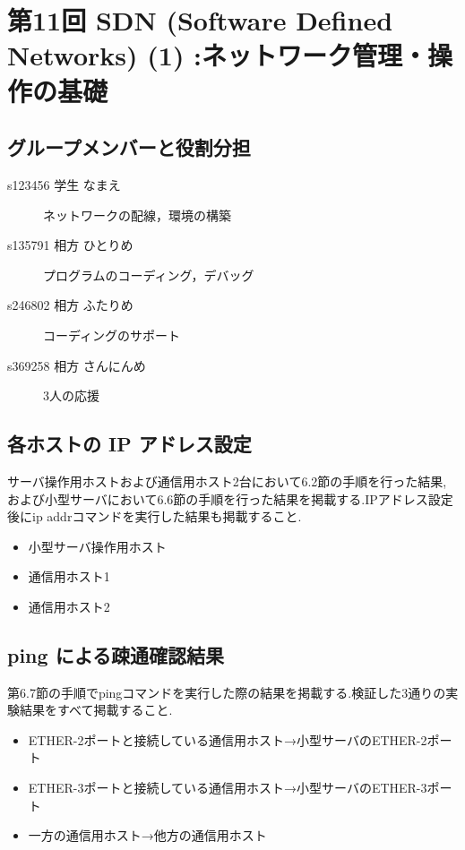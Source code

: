 \documentclass[a4j]{celb-report}
\begin{document}
\section{第11回 SDN (Software Defined Networks) (1) :ネットワーク管理・操作の基礎}
\subsection{グループメンバーと役割分担}
%
\begin{description}
 \item[s123456 学生 なまえ] ネットワークの配線，環境の構築
 \item[s135791 相方 ひとりめ] プログラムのコーディング，デバッグ
 \item[s246802 相方 ふたりめ] コーディングのサポート
 \item[s369258 相方 さんにんめ] 3人の応援
\end{description}
\setcounter{subsection}{0}
\subsection{各ホストの IP アドレス設定}
サーバ操作用ホストおよび通信用ホスト2台において6.2節の手順を行った結果,および小型サーバにおいて6.6節の手順を行った結果を掲載する.IPアドレス設定後にip addrコマンドを実行した結果も掲載すること.
\begin{itemize}
 \item 小型サーバ操作用ホスト
 
 \item 通信用ホスト1
 
 \item 通信用ホスト2
 
\end{itemize}
\subsection{ping による疎通確認結果}
第6.7節の手順でpingコマンドを実行した際の結果を掲載する.検証した3通りの実験結果をすべて掲載すること.
\begin{itemize}
 \item ETHER-2ポートと接続している通信用ホスト→小型サーバのETHER-2ポート
 
 \item ETHER-3ポートと接続している通信用ホスト→小型サーバのETHER-3ポート
 \item 一方の通信用ホスト→他方の通信用ホスト
\end{itemize}
\end{document}
